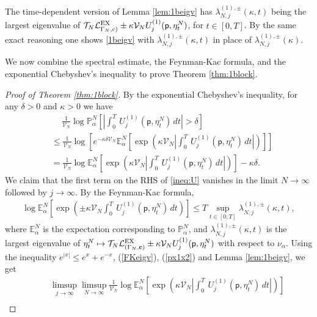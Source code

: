 \documentclass[11pt]{amsart}
\theoremstyle{plain}
\theoremstyle{definition}
\theoremstyle{remark}
\newcommand{\pt}{\mathsf{p}}
\newcommand{\Uone}[1]{U^{(1)}_{{#1}}}
\begin{document}
The time-dependent version of Lemma \ref{lem:1beigv} has $\lambda^{(1),\pm}_{N,j}(\kappa, t)$ being the largest eigenvalue of $\mathcal{T}_N \mathcal{L}^{\rm EX}_{\Gamma_N, c)}\pm \kappa \mathcal{V}_N U_j^{(1)}(\pt, \eta_t^N)$, for $t\in [0,T]$. By the same exact reasoning one shows \eqref{1beigv} with $\lambda^{(1),\pm}_{N,j}(\kappa, t)$ in place of $\lambda^{(1),\pm}_{N,j}(\kappa)$.


We now combine the spectral estimate, the Feynman-Kac formula, and the exponential Chebyshev's inequality to prove Theorem \ref{thm:1block}.

\begin{proof}[Proof of Theorem \ref{thm:1block}]
By the exponential Chebyshev's inequality, for any $\delta>0$ and $\kappa>0$ we have
\begin{align}
\label{ineq:U}
&~\quad\frac{1}{\mathcal{V}_N} \log \mathbb{P}^N_{\alpha}\left[\left|\int_0^T\, \Uone{j}(\pt,\eta^N_t)\,dt\right| >\delta \right] \\ 
\nonumber &\leq \frac{1}{\mathcal{V}_N} \log \left[e^{-\kappa\delta \mathcal{V}_N} \mathbb{E}^N_{\alpha}\left[\exp\left(\kappa \mathcal{V}_N\left|\int_0^T  \, \Uone{j}(\pt,\eta^N_t)\,dt\right| \right)\right]\right]\\
\nonumber &= \frac{1}{\mathcal{V}_N} \log \mathbb{E}^N_{\alpha} \left[\exp\left(\kappa \mathcal{V}_N \left| \int_0^T \, \Uone{j}(\pt,\eta_t^N)\,dt\right|\right)\right] - \kappa\delta.
\end{align}
We claim that the first term on the RHS of \eqref{ineq:U} vanishes in the limit $N\to\infty$ followed by $j\to\infty$. By the Feynman-Kac formula, 
\begin{align}
\label{FKeigv}
\log \mathbb{E}^N_{\alpha}\left[\exp\left(\pm \kappa \mathcal{V}_N \int_0^T\, \Uone{j}(\pt,\eta_t^N)\,dt\right)\right] \leq T \sup_{t\in [0,T]} \lambda^{(1),\pm}_{N,j}(\kappa,t),
\end{align}
where $\mathbb{E}^N_\alpha$ is the expectation corresponding to $\mathbb{P}^N_\alpha$, and $\lambda^{(1),\pm}_{N,j}(\kappa,t)$ is the largest eigenvalue of $\eta_t^N \mapsto \mathcal{T}_N \mathcal{L}^{\rm EX}_{(\Gamma_N,{\bf c})} \pm \kappa \mathcal{V}_N \Uone{j}(\pt,\eta_t^N)$ with respect to $\nu_\alpha$. Using the inequality $e^{|x|} \leq e^x + e^{-x}$, (\ref{FKeigv}), (\ref{px1x2}) and Lemma \ref{lem:1beigv}, we get
\begin{align*}
& ~\quad\limsup_{j\to\infty} \limsup_{N\to\infty} \frac{1}{\mathcal{V}_N}  \log \mathbb{E}^N_{\alpha} \left[\exp\left(\kappa \mathcal{V}_N \left| \int_0^T \, \Uone{j}(\pt,\eta_t^N)\,dt\right|\right)\right]\\

\end{align*}
\end{proof}
\end{document}
